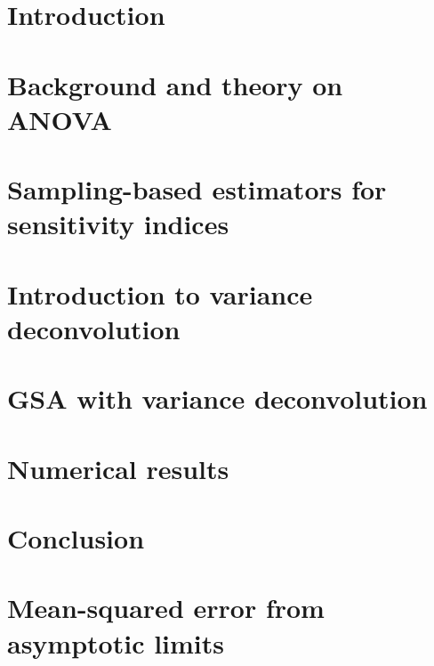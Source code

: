 \documentclass[final,3p,times,dvipsnames]{elsarticle}
\begin{document}
\section{Introduction}
\label{sec:intro}



\section{Background and theory on ANOVA}
\label{sec:anova}



\section{Sampling-based estimators for sensitivity indices}
\label{sec:sampling}



\section{Introduction to variance deconvolution}
\label{sec:deconvolution}



\section{GSA with variance deconvolution}
\label{sec:gsa-deconvolution}



\section{Numerical results}
\label{sec:results}



\section{Conclusion}
\label{sec:conclusion}


\appendix
\section{Mean-squared error from asymptotic limits}
\label{appx:mse}





\end{document}
